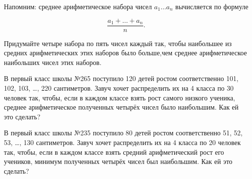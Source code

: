 ﻿
\noindent Напомним: среднее арифметическое набора чисел $a_1 \ldots a_n$ вычисляется по формуле

$$\frac{a_1 + \ldots + a_n}{n}.$$

\begin{enumerate}
\itA Придумайте четыре набора по пять чисел каждый так, чтобы наибольшее из средних арифметических этих наборов было больше,\linebreak чем среднее арифметическое наибольших чисел этих наборов.

\itB В первый класс школы №265 поступило 120 детей ростом соответственно 101, 102, 103, …, 220 сантиметров. Завуч хочет распределить их на 4 класса по 30 человек так, чтобы, если в каждом классе взять рост самого низкого ученика, среднее арифметическое полученных четырёх чисел было наибольшим. Как ей это сделать?

\itC В первый класс школы №235 поступило 80 детей ростом соответственно 51, 52, 53, …, 130 сантиметров. Завуч хочет распределить их на 4 класса по 20 человек так, чтобы, если в каждом классе взять средний арифметический рост его учеников, минимум полученных четырёх чисел был наибольшим. Как ей это сделать?
\end{enumerate}